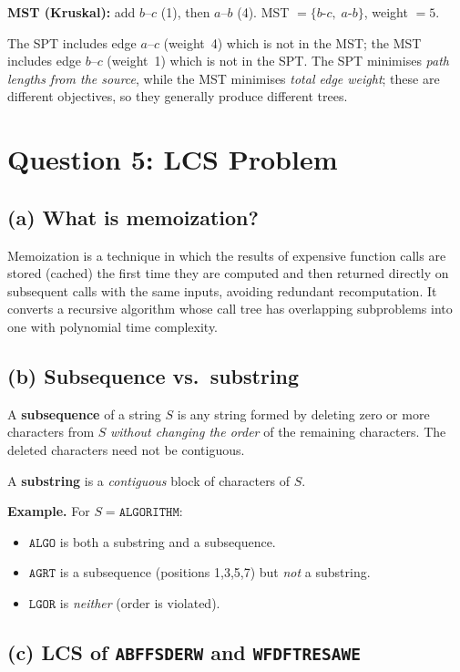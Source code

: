 \documentclass[11pt]{article}
\begin{document}
\textbf{MST (Kruskal):} add $b$--$c$ (1), then $a$--$b$ (4).
MST $= \{b\text{-}c,\; a\text{-}b\}$, weight $= 5$.

The SPT includes edge $a$--$c$ (weight~4) which is not in the MST; the MST includes edge $b$--$c$ (weight~1) which is not in the SPT.  The SPT minimises \emph{path lengths from the source}, while the MST minimises \emph{total edge weight}; these are different objectives, so they generally produce different trees.

\newpage
\section*{Question 5: LCS Problem}

\subsection*{(a) What is memoization?}

Memoization is a technique in which the results of expensive function calls are stored (cached) the first time they are computed and then returned directly on subsequent calls with the same inputs, avoiding redundant recomputation.  It converts a recursive algorithm whose call tree has overlapping subproblems into one with polynomial time complexity.

\subsection*{(b) Subsequence vs.\ substring}

A \textbf{subsequence} of a string $S$ is any string formed by deleting zero or more characters from $S$ \emph{without changing the order} of the remaining characters.  The deleted characters need not be contiguous.

A \textbf{substring} is a \emph{contiguous} block of characters of $S$.

\textbf{Example.}  For $S = \texttt{ALGORITHM}$:
\begin{itemize}
  \item $\texttt{ALGO}$ is both a substring and a subsequence.
  \item $\texttt{AGRT}$ is a subsequence (positions 1,3,5,7) but \emph{not} a substring.
  \item $\texttt{LGOR}$ is \emph{neither} (order is violated).
\end{itemize}

\subsection*{(c) LCS of \texttt{ABFFSDERW} and \texttt{WFDFTRESAWE}}
\end{document}
